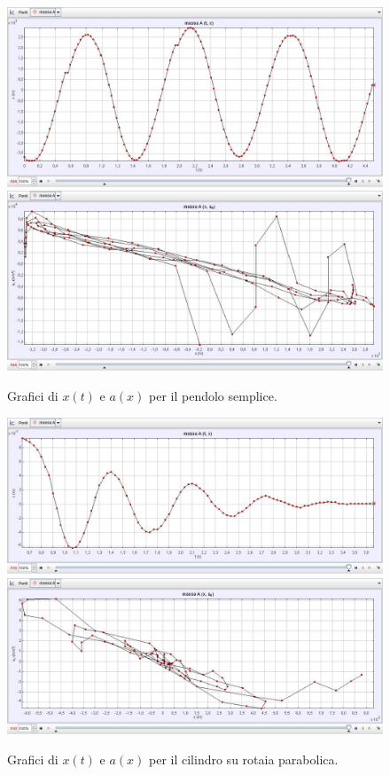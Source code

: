 \documentclass{article}
\begin{document}
\begin{figure}
\centering
  \includegraphics[width=\textwidth]{pendolo_x_t}
  \includegraphics[width=\textwidth]{pendolo_a_x}
  \caption{Grafici di $x(t)$ e $a(x)$ per il pendolo semplice.}
  \label{fig:pendulum}
\end{figure}

\begin{figure}
\centering
  \includegraphics[width=\textwidth]{cilindro_rotaia_x_t}
  \includegraphics[width=\textwidth]{cilindro_rotaia_a_x}
  \caption{Grafici di $x(t)$ e $a(x)$ per il cilindro su rotaia parabolica.}
  \label{fig:rotaia_parabolica}
\end{figure}
\end{document}
